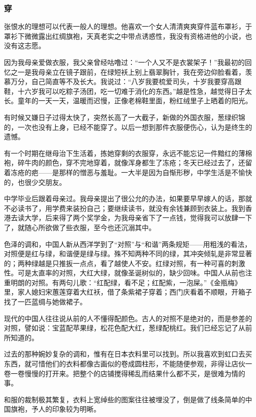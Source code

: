 \subsubsection*{穿}
\par 张恨水的理想可以代表一般人的理想。他喜欢一个女人清清爽爽穿件蓝布罩衫，于罩衫下微微露出红绸旗袍，天真老实之中带点诱惑性，我没有资格进他的小说，也没有这志愿。
\par 因为我母亲爱做衣服，我父亲曾经咕噜过：“一个人又不是衣裳架子！”我最初的回忆之一是我母亲立在镜子跟前，在绿短袄上别上翡翠胸针，我在旁边仰脸看着，羡慕万分，自己简直等不及长大。我说过：“八岁我要梳爱司头，十岁我要穿高跟鞋，十六岁我可以吃粽子汤团，吃一切难于消化的东西。”越是性急，越觉得日子太长。童年的一天一天，温暖而迟慢，正像老棉鞋里面，粉红绒里子上晒着的阳光。
\par 有时候又嫌日子过得太快了，突然长高了一大截子，新做的外国衣服，葱绿织锦的，一次也没有上身，已经不能穿了。以后一想到那件衣服便伤心，认为是终生的遗憾。
\par 有一个时期在继母治下生活着，拣她穿剩的衣服穿，永远不能忘记一件黯红的薄棉袍，碎牛肉的颜色，穿不完地穿着，就像浑身都生了冻疮；冬天已经过去了，还留着冻疮的疤——是那样的憎恶与羞耻。一大半是因为自惭形秽，中学生活是不愉快的，也很少交朋友。
\par 中学毕业后跟着母亲过。我母亲提出了很公允的办法，如果要早早嫁人的话，那就不必读书了，用学费来装扮自己；要继续读书，就没有余钱兼顾到衣装上。我到香港去读大学，后来得了两个奖学金，为我母亲省下了一点钱，觉得我可以放肆一下了，就随心所欲做了些衣服，至今也还沉溺其中。
\par 色泽的调和，中国人新从西洋学到了“对照”与“和谐”两条规矩——用粗浅的看法，对照便是红与绿，和谐便是绿与绿。殊不知两种不同的绿，其冲突倾轧是非常显著的；两种绿越是只推扳一点点，看了越使人不安。红绿对照，有一种可喜的刺激性。可是太直率的对照，大红大绿，就像圣诞树似的，缺少回味。中国人从前也注重明朗的对照。有两句儿歌：“红配绿，看不足；红配紫，一泡屎。”《金瓶梅》里，家人媳妇宋蕙莲穿着大红袄，借了条紫裙子穿着；西门庆看着不顺眼，开箱子找了一匹蓝绸与她做裙子。
\par 现代的中国人往往说从前的人不懂得配颜色。古人的对照不是绝对的，而是参差的对照，譬如说：宝蓝配苹果绿，松花色配大红，葱绿配桃红。我们已经忘记了从前所知道的。
\par 过去的那种婉妙复杂的调和，惟有在日本衣料里可以找到。所以我喜欢到虹口去买东西，就可惜他们的衣料都像古画似的卷成圆柱形，不能随便参观，非得让店伙一卷一卷慢慢的打开来。把整个的店铺搅得稀乱而结果什么都不买，是很难为情的事。
\par 和服的裁制极其繁复，衣料上宽绰些的图案往往被埋没了，倒是做了线条简单的中国旗袍，予人的印象较为明晰。
